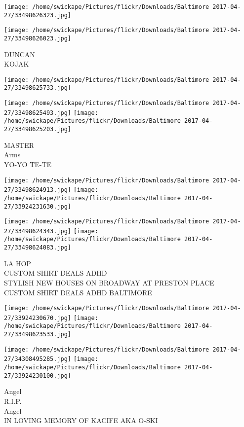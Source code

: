 \documentclass[10pt,letterpaper]{article}
\begin{document}
\texttt{[image: /home/swickape/Pictures/flickr/Downloads/Baltimore 2017-04-27/33498626323.jpg]}

\vspace{0.25in}
\texttt{[image: /home/swickape/Pictures/flickr/Downloads/Baltimore 2017-04-27/33498626023.jpg]}

DUNCAN\\
KOJAK
\pagebreak

\texttt{[image: /home/swickape/Pictures/flickr/Downloads/Baltimore 2017-04-27/33498625733.jpg]}

\vspace{0.25in}
\texttt{[image: /home/swickape/Pictures/flickr/Downloads/Baltimore 2017-04-27/33498625493.jpg]}
\texttt{[image: /home/swickape/Pictures/flickr/Downloads/Baltimore 2017-04-27/33498625203.jpg]}

MASTER\\
Arms\\
YO{-}YO TE{-}TE
\pagebreak

\texttt{[image: /home/swickape/Pictures/flickr/Downloads/Baltimore 2017-04-27/33498624913.jpg]}
\texttt{[image: /home/swickape/Pictures/flickr/Downloads/Baltimore 2017-04-27/33924231630.jpg]}

\texttt{[image: /home/swickape/Pictures/flickr/Downloads/Baltimore 2017-04-27/33498624343.jpg]}
\texttt{[image: /home/swickape/Pictures/flickr/Downloads/Baltimore 2017-04-27/33498624083.jpg]}

LA HOP\\
CUSTOM SHIRT DEALS ADHD\\
STYLISH NEW HOUSES ON BROADWAY AT PRESTON PLACE\\
CUSTOM SHIRT DEALS ADHD BALTIMORE
\pagebreak

\texttt{[image: /home/swickape/Pictures/flickr/Downloads/Baltimore 2017-04-27/33924230670.jpg]}
\texttt{[image: /home/swickape/Pictures/flickr/Downloads/Baltimore 2017-04-27/33498623533.jpg]}

\texttt{[image: /home/swickape/Pictures/flickr/Downloads/Baltimore 2017-04-27/34308495285.jpg]}
\texttt{[image: /home/swickape/Pictures/flickr/Downloads/Baltimore 2017-04-27/33924230100.jpg]}

Angel\\
R.I.P.\\
Angel\\
IN LOVING MEMORY OF KACIFE AKA O{-}SKI
\pagebreak
\end{document}
